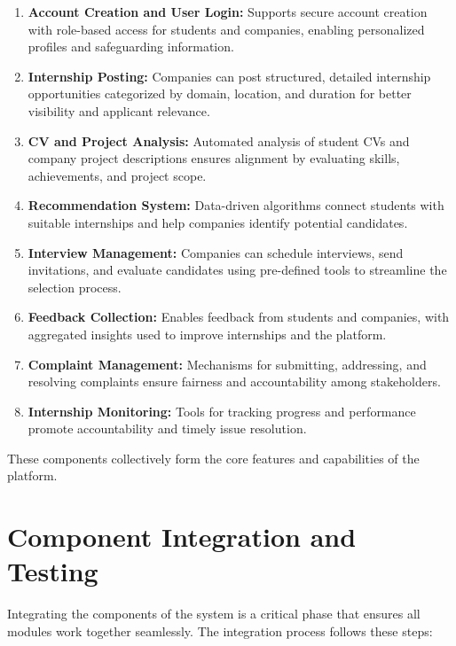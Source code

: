 \begin{enumerate}
    \item \textbf{Account Creation and User Login:}  
    Supports secure account creation with role-based access for students and companies, enabling personalized profiles and safeguarding information.

    \item \textbf{Internship Posting:}  
    Companies can post structured, detailed internship opportunities categorized by domain, location, and duration for better visibility and applicant relevance.

    \item \textbf{CV and Project Analysis:}  
    Automated analysis of student CVs and company project descriptions ensures alignment by evaluating skills, achievements, and project scope.

    \item \textbf{Recommendation System:}  
    Data-driven algorithms connect students with suitable internships and help companies identify potential candidates.

    \item \textbf{Interview Management:}  
    Companies can schedule interviews, send invitations, and evaluate candidates using pre-defined tools to streamline the selection process.

    \item \textbf{Feedback Collection:}  
    Enables feedback from students and companies, with aggregated insights used to improve internships and the platform.

    \item \textbf{Complaint Management:}  
    Mechanisms for submitting, addressing, and resolving complaints ensure fairness and accountability among stakeholders.

    \item \textbf{Internship Monitoring:}  
    Tools for tracking progress and performance promote accountability and timely issue resolution.
\end{enumerate}

These components collectively form the core features and capabilities of the platform.

\section{Component Integration and Testing\label{sec:integration}}

Integrating the components of the system is a critical phase that ensures all modules work together seamlessly. The integration process follows these steps:


